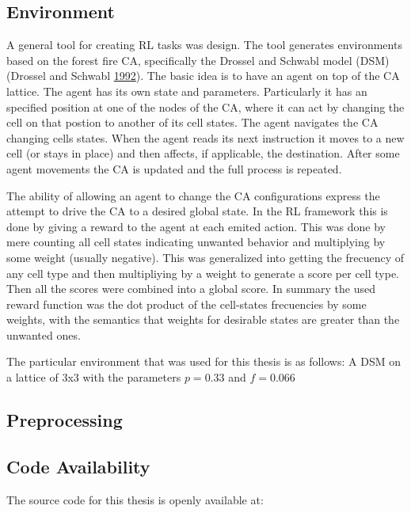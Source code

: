 \documentclass[
]{book}
\begin{document}
\hypertarget{environment}{%
\subsection{Environment}\label{environment}}

A general tool for creating RL tasks was design. The tool generates environments based on the forest fire CA, specifically the Drossel and Schwabl model (DSM) (Drossel and Schwabl \protect\hyperlink{ref-drossel1992self}{1992}). The basic idea is to have an agent on top of the CA lattice. The agent has its own state and parameters. Particularly it has an specified position at one of the nodes of the CA, where it can act by changing the cell on that postion to another of its cell states. The agent navigates the CA changing cells states. When the agent reads its next instruction it moves to a new cell (or stays in place) and then affects, if applicable, the destination. After some agent movements the CA is updated and the full process is repeated.

The ability of allowing an agent to change the CA configurations express the attempt to drive the CA to a desired global state. In the RL framework this is done by giving a reward to the agent at each emited action. This was done by mere counting all cell states indicating unwanted behavior and multiplying by some weight (usually negative). This was generalized into getting the frecuency of any cell type and then multipliying by a weight to generate a score per cell type. Then all the scores were combined into a global score. In summary the used reward function was the dot product of the cell-states frecuencies by some weights, with the semantics that weights for desirable states are greater than the unwanted ones.

The particular environment that was used for this thesis is as follows: A DSM on a lattice of 3x3 with the parameters \(p=0.33\) and \(f=0.066\)

\hypertarget{preprocessing}{%
\subsection{Preprocessing}\label{preprocessing}}

\hypertarget{code-availability}{%
\subsection{Code Availability}\label{code-availability}}

The source code for this thesis is openly available at:
\end{document}
